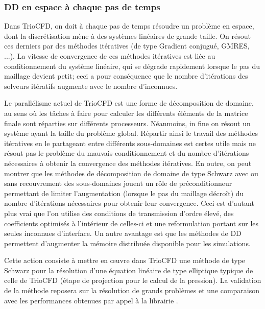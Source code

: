 \subsubsection{DD en espace \`a chaque pas de temps}
Dans TrioCFD, on doit \`a chaque pas de temps r\'esoudre un probl\`eme en espace, dont la discr\'etisation m\`ene \`a des syst\`emes lin\'eaires de grande taille. On r\'esout ces derniers par des m\'ethodes it\'eratives (de type Gradient conjugu\'e, GMRES, ...).
La vitesse de convergence de ces m\'ethodes it\'eratives est li\'ee au conditionnement du syst\`eme lin\'eaire, qui se d\'egrade rapidement lorsque le pas du maillage devient petit; ceci a pour cons\'equence que le nombre d'it\'erations des solveurs it\'eratifs
augmente avec le nombre d'inconnues.

Le parall\'elisme actuel de TrioCFD est une forme de d\'ecomposition de domaine, au sens o\`u les t\^aches \`a faire pour calculer les diff\'erents \'el\'ements de la matrice finale sont r\'eparties sur diff\'erents processeurs. N\'eanmoins, in fine on r\'esout un syst\`eme ayant la taille du probl\`eme global. R\'epartir ainsi le travail des m\'ethodes it\'eratives en le partageant entre diff\'erents sous-domaines est certes utile mais ne r\'esout pas le probl\`eme du mauvais conditionnement et du nombre d'it\'erations n\'ecessaires \`a obtenir la convergence des m\'ethodes it\'eratives.
En outre, on peut montrer que les m\'ethodes de d\'ecomposition de domaine  de type Schwarz avec ou sans recouvrement des sous-domaines jouent un r\^ole de pr\'econditionneur
permettant de limiter l'augmentation (lorsque le pas du maillage d\'ecro\^it) du nombre d'it\'erations n\'ecessaires pour obtenir leur convergence. Ceci est d'autant plus vrai que l'on utilise des conditions de transmission d'ordre \'elev\'e, des coefficients optimis\'es \`a l'int\'erieur de celles-ci et une reformulation portant sur les seules inconnues d'interface. Un autre avantage est que les m\'ethodes de DD permettent d'augmenter la m\'emoire distribu\'ee disponible pour les simulations.

Cette action consiste \`a mettre en {\oe}uvre dans TrioCFD une m\'ethode de type Schwarz pour la r\'esolution d'une \'equation lin\'eaire de type elliptique typique de celle de TrioCFD (\'etape de projection pour le calcul de la pression). La validation de la m\'ethode reposera sur la r\'esolution de grands probl\`emes et une comparaison avec les performances obtenues par appel \`a la librairie {}.\\

